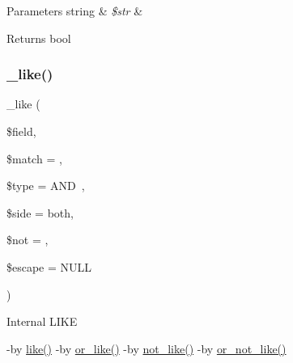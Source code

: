 \begin{DoxyParams}[1]{Parameters}
string & {\em \$str} & \\
\hline
\end{DoxyParams}
\begin{DoxyReturn}{Returns}
bool 
\end{DoxyReturn}
\mbox{\label{class_c_i___d_b__query__builder_abe8f3477d4b15bf422fc52ba753056b5}} 
\subsubsection{\texorpdfstring{\+\_\+like()}{\_like()}}
{\footnotesize\ttfamily \+\_\+like (\begin{DoxyParamCaption}\item[{}]{\$field,  }\item[{}]{\$match = {\ttfamily \textquotesingle{}\textquotesingle{}},  }\item[{}]{\$type = {\ttfamily \textquotesingle{}AND~\textquotesingle{}},  }\item[{}]{\$side = {\ttfamily \textquotesingle{}both\textquotesingle{}},  }\item[{}]{\$not = {\ttfamily \textquotesingle{}\textquotesingle{}},  }\item[{}]{\$escape = {\ttfamily NULL} }\end{DoxyParamCaption})\hspace{0.3cm}{\ttfamily [protected]}}

Internal L\+I\+KE

-\/by \mbox{\hyperlink{class_c_i___d_b__query__builder_ada4c73fd6f292084d8b84b0db958fcc1}{like()}} -\/by \mbox{\hyperlink{class_c_i___d_b__query__builder_aef08c014f8925124292fa6a65c014d25}{or\+\_\+like()}} -\/by \mbox{\hyperlink{class_c_i___d_b__query__builder_ac87c3421e7d396a714740b1a9c0fe8ea}{not\+\_\+like()}} -\/by \mbox{\hyperlink{class_c_i___d_b__query__builder_a37af2f8d33a06c1cc2ad9dafc2c88e90}{or\+\_\+not\+\_\+like()}}


